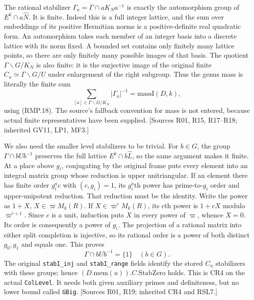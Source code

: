 The rational stabilizer
$\Gamma_a=\Gamma\cap aK_Na^{-1}$ is exactly the automorphism
group of $E^k\cap a\widehat N$. It is finite. Indeed this is a
full integer lattice, and the sum over embeddings of its positive
Hermitian norms is a positive-definite real quadratic form.
An automorphism takes each member of an integer basis into a
discrete lattice with its norm fixed. A bounded set contains only
finitely many lattice points, so there are only finitely many
possible images of that basis.
The quotient $\Gamma\backslash G/K_N$ is also finite: it is the
surjective image of the original finite $C_u\simeq\Gamma\backslash G/U$
under enlargement of the right subgroup. Thus the genus mass is
literally the finite sum
\[
 \sum_{[a]\in\Gamma\backslash G/K_N}|\Gamma_a|^{-1}
             =\mathrm{massI}(D,k),                    \tag{RMP.20}
\]
using (RMP.18). The source's fallback convention for mass is not
entered, because actual finite representatives have been supplied.
[Sources R01, R15, R17--R18; inherited GV11, LP1, MF3.]

We also need the smaller level stabilizers to be trivial.
For $b\in G$, the group $\Gamma\cap bUb^{-1}$ preserves the
full lattice $E^k\cap b\widehat L$, so the same argument makes
it finite. At a place above $g_i$, conjugating by the original
frame puts every element into an integral matrix group whose
reduction is upper unitriangular.
If an element there has finite order $g_i^a c$ with
$(c,g_i)=1$, its $g_i^a$th power has prime-to-$g_i$ order and
upper-unipotent reduction. That reduction must be the identity.
Write the power as $1+X$, $X\in\varpi M_k(R)$. If
$X\in\varpi^rM_k(R)$, its $c$th power is
$1+cX$ modulo $\varpi^{r+1}$. Since $c$ is a unit, induction
puts $X$ in every power of $\varpi$, whence $X=0$.
Its order is consequently a power of $g_i$. The projection of a
rational matrix into either split completion is injective, so its
rational order is a power of both distinct $g_0,g_1$ and equals one.
This proves
\[
                    \Gamma\cap bUb^{-1}=\{1\}
                         \quad(b\in G).               \tag{RMP.21}
\]
The original \texttt{stabI\_inj} and \texttt{stabI\_range} fields
identify the stored $C_u$ stabilizers with these groups; hence
$(D.\mathrm{mem}(u)).C.\mathrm{StabZero}$ holds.
This is CR4 on the actual \texttt{ColLevel}. It needs both given
auxiliary primes and definiteness, but no lower bound called
\texttt{GBig}. [Sources R01, R19; inherited CR4 and RSL7.]

